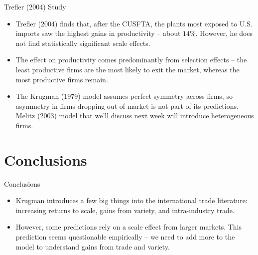 \documentclass[aspectratio=169]{beamer}
\begin{document}

\begin{frame}{Trefler (2004) Study}

\begin{itemize}
    \item<1-> Trefler (2004) finds that, after the CUSFTA, the plants most exposed to U.S. imports saw the highest gains in productivity – about $ 14\% $.  However, he does not find statistically significant scale effects.
    \item<2-> The effect on productivity comes predominantly from selection effects – the least productive firms are the most likely to exit the market, whereas the most productive firms remain.
    \item<3-> The Krugman (1979) model assumes perfect symmetry across firms, so asymmetry in firms dropping out of market is not part of its predictions.  Melitz (2003) model that we’ll discuss next week will introduce heterogeneous firms.
\end{itemize}
    
\end{frame}


\section{Conclusions}


\begin{frame}{Conclusions}

\begin{itemize}
    \item<1-> Krugman introduces a few big things into the international trade literature: increasing returns to scale, gains from variety, and intra-industry trade.
    \item<2-> However, some predictions rely on a scale effect from larger markets.  This prediction seems questionable empirically – we need to add more to the model to understand gains from trade and variety.
\end{itemize}
    
\end{frame}

\end{document}
